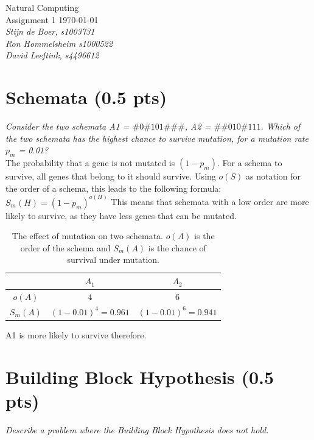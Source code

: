 \documentclass{article}
\date{\today}
\begin{document}
\begin{flushright}
Natural Computing \\ 
Assignment 1 \today \\ 
\emph{Stijn de Boer, \textit{s1003731} \\ Ron Hommelsheim \textit{s1000522} \\  David Leeftink, \textit{s4496612} }\\\end{flushright}

\section{Schemata (0.5 pts)}
\textit{Consider the two schemata A1 = $\#0\#101\#\#\#$, A2 =
$\#\#010\#111$. Which of the two schemata has the highest chance to survive mutation, for a mutation rate $p_m$ = 0.01?} \\ 

The probability that a gene is not mutated is $(1-p_m)$. For a schema to survive, all genes that belong to it should survive. Using $o(S)$ as notation for the order of a schema, this leads to the following formula: $S_m(H)=(1-p_m)^{o(H)}$
This means that schemata with a low order are more likely to survive, as they have less genes that can be mutated.

\begin{table}[H]
    \centering
    \begin{tabular}{|c|c|c|}
        \hline
                 & $A_1$                  &          $A_2$         \\ \hline \hline
        $o(A)$   & $4$                    & $6$                    \\ \hline
        $S_m(A)$ & $(1-0.01)^4 = 0.961$   & $(1-0.01)^6 = 0.941$   \\ \hline
    \end{tabular}
    
\caption{The effect of mutation on two schemata. $o(A)$ is the order of the schema and $S_m(A)$ is the chance of survival under mutation.}
\label{tab:mut}
\end{table}
A1 is more likely to survive therefore.


\section{Building Block Hypothesis (0.5 pts)}
\textit{Describe a problem where the Building Block Hypothesis does not hold.} \\
\end{document}
